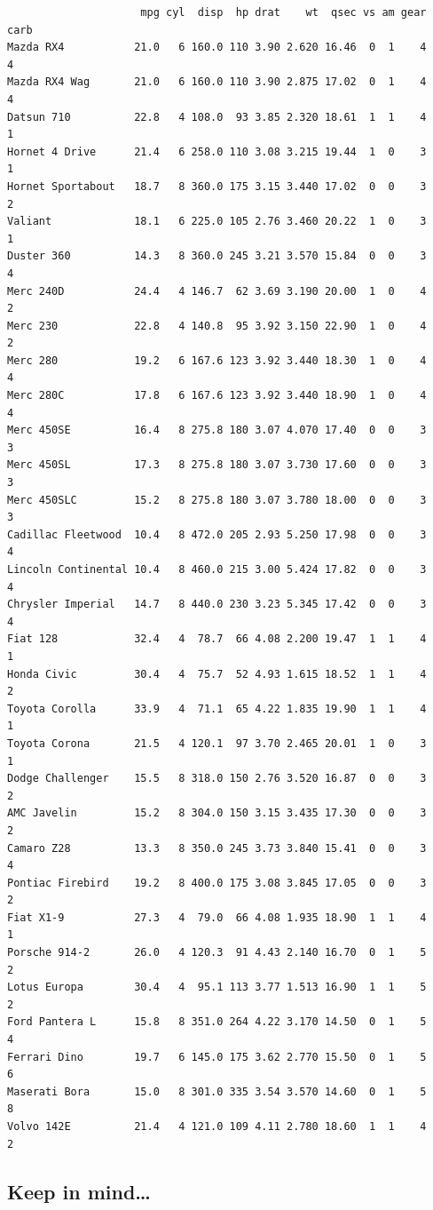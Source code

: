\documentclass[
]{article}
\begin{document}
\begin{verbatim}
                     mpg cyl  disp  hp drat    wt  qsec vs am gear carb
Mazda RX4           21.0   6 160.0 110 3.90 2.620 16.46  0  1    4    4
Mazda RX4 Wag       21.0   6 160.0 110 3.90 2.875 17.02  0  1    4    4
Datsun 710          22.8   4 108.0  93 3.85 2.320 18.61  1  1    4    1
Hornet 4 Drive      21.4   6 258.0 110 3.08 3.215 19.44  1  0    3    1
Hornet Sportabout   18.7   8 360.0 175 3.15 3.440 17.02  0  0    3    2
Valiant             18.1   6 225.0 105 2.76 3.460 20.22  1  0    3    1
Duster 360          14.3   8 360.0 245 3.21 3.570 15.84  0  0    3    4
Merc 240D           24.4   4 146.7  62 3.69 3.190 20.00  1  0    4    2
Merc 230            22.8   4 140.8  95 3.92 3.150 22.90  1  0    4    2
Merc 280            19.2   6 167.6 123 3.92 3.440 18.30  1  0    4    4
Merc 280C           17.8   6 167.6 123 3.92 3.440 18.90  1  0    4    4
Merc 450SE          16.4   8 275.8 180 3.07 4.070 17.40  0  0    3    3
Merc 450SL          17.3   8 275.8 180 3.07 3.730 17.60  0  0    3    3
Merc 450SLC         15.2   8 275.8 180 3.07 3.780 18.00  0  0    3    3
Cadillac Fleetwood  10.4   8 472.0 205 2.93 5.250 17.98  0  0    3    4
Lincoln Continental 10.4   8 460.0 215 3.00 5.424 17.82  0  0    3    4
Chrysler Imperial   14.7   8 440.0 230 3.23 5.345 17.42  0  0    3    4
Fiat 128            32.4   4  78.7  66 4.08 2.200 19.47  1  1    4    1
Honda Civic         30.4   4  75.7  52 4.93 1.615 18.52  1  1    4    2
Toyota Corolla      33.9   4  71.1  65 4.22 1.835 19.90  1  1    4    1
Toyota Corona       21.5   4 120.1  97 3.70 2.465 20.01  1  0    3    1
Dodge Challenger    15.5   8 318.0 150 2.76 3.520 16.87  0  0    3    2
AMC Javelin         15.2   8 304.0 150 3.15 3.435 17.30  0  0    3    2
Camaro Z28          13.3   8 350.0 245 3.73 3.840 15.41  0  0    3    4
Pontiac Firebird    19.2   8 400.0 175 3.08 3.845 17.05  0  0    3    2
Fiat X1-9           27.3   4  79.0  66 4.08 1.935 18.90  1  1    4    1
Porsche 914-2       26.0   4 120.3  91 4.43 2.140 16.70  0  1    5    2
Lotus Europa        30.4   4  95.1 113 3.77 1.513 16.90  1  1    5    2
Ford Pantera L      15.8   8 351.0 264 4.22 3.170 14.50  0  1    5    4
Ferrari Dino        19.7   6 145.0 175 3.62 2.770 15.50  0  1    5    6
Maserati Bora       15.0   8 301.0 335 3.54 3.570 14.60  0  1    5    8
Volvo 142E          21.4   4 121.0 109 4.11 2.780 18.60  1  1    4    2
\end{verbatim}

\hypertarget{keep-in-mind}{%
\subsection{Keep in mind\ldots{}}\label{keep-in-mind}}
\end{document}
